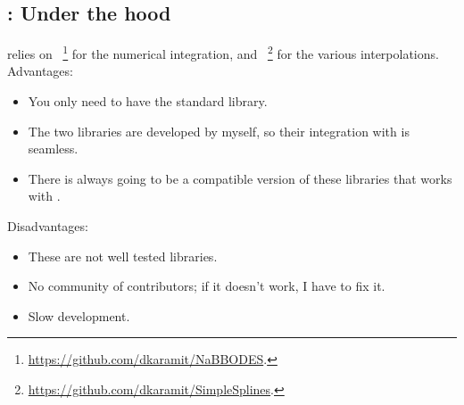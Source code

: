 \documentclass[10pt,utf8,compress,xcolor=dvipsnames]{beamer}
\begin{document}
\subsection{\mimes: Under the hood}
\begin{frame}{\insertsubsectionhead}
	\mimes relies on ~\footnote{\fontF \href{https://github.com/dkaramit/NaBBODES}{https://github.com/dkaramit/NaBBODES}.} for the numerical integration, and ~\footnote{\fontF \href{https://github.com/dkaramit/SimpleSplines}{https://github.com/dkaramit/SimpleSplines}.} for the various interpolations.\\[0.3cm] 
	
	Advantages:
	\begin{itemize}
		\item You only need to have the standard \CPP library.
		\item The two libraries are developed by myself, so their integration with \mimes is seamless.
		\item There is always going to be a compatible version of these libraries that works with \mimes.\\[0.3cm]
	\end{itemize}	
	
	Disadvantages:
	\begin{itemize}
		\item These are not well tested libraries.
		\item No community of contributors; if it doesn't work, I have to fix it.
		\item Slow development.
	\end{itemize}	
	
\end{frame}
\end{document}
